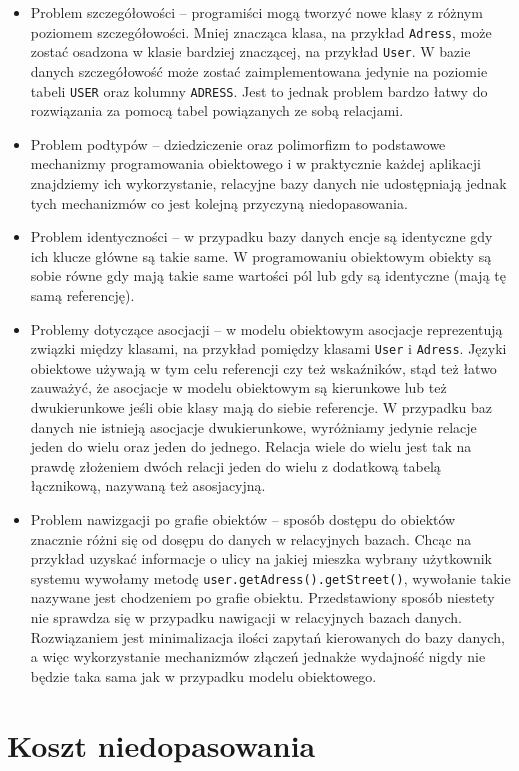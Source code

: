 \documentclass[12pt]{report}
\begin{document}
\begin{itemize}
\item Problem szczegółowości -- programiści mogą tworzyć nowe klasy z różnym poziomem szczegółowości. Mniej znacząca klasa, na przykład {\tt Adress}, może zostać
osadzona w klasie bardziej znaczącej, na przykład {\tt User}. W bazie danych szczegółowość może zostać zaimplementowana jedynie na po\-ziomie tabeli
{\tt USER} oraz kolumny {\tt ADRESS}. Jest to jednak problem bardzo łatwy do rozwiązania za pomocą tabel powiązanych ze sobą relacjami.
\item Problem podtypów -- dziedziczenie oraz polimorfizm to podstawowe mechanizmy programowania obiektowego i w praktycznie każdej aplikacji znajdziemy ich 
wykorzystanie, relacyjne bazy danych nie udostępniają jednak tych mechanizmów co jest kolejną przyczyną niedopasowania.
\item Problem identyczności -- w przypadku bazy danych encje są identyczne gdy ich klucze główne są takie same. W programowaniu obiektowym obiekty są sobie równe
gdy mają takie same wartości pól lub gdy są identyczne (mają tę samą referencję).
\item Problemy dotyczące asocjacji -- w modelu obiektowym asocjacje reprezentują związki między klasami, na przykład pomiędzy klasami {\tt User} i {\tt Adress}. Języki
obiektowe używają w tym celu referencji czy też wskaźników, stąd też łatwo zauważyć, że asocjacje w modelu obiektowym są kierunkowe lub też dwu\-kierunkowe jeśli
obie klasy mają do siebie referencje. W przypadku baz danych nie istnieją asocjacje dwukierunkowe, wyróżniamy jedynie relacje jeden do wielu oraz jeden do jednego.
Relacja wiele do wielu jest tak na prawdę złożeniem dwóch relacji jeden do wielu z dodatkową tabelą łącznikową, na\-zywaną też asosjacyjną.
\item Problem nawizgacji po grafie obiektów -- sposób dostępu do obiektów zna\-cznie różni się od dosępu do danych w relacyjnych bazach. Chcąc na przykład uzyskać
informacje o ulicy na jakiej mieszka wybrany użytkownik systemu wywołamy metodę {\tt user.getAdress().getStreet()}, wywołanie takie nazywane jest chodzeniem
po grafie obiektu. Przedstawiony sposób niestety nie sprawdza się w przypadku nawigacji w relacyjnych bazach danych. Rozwią\-zaniem jest minimalizacja ilości zapytań
kierowanych do bazy danych, a więc wykorzystanie mechanizmów złączeń jednakże wydajność nigdy nie będzie taka sama jak w przypadku modelu obiektowego.
\end{itemize}

\section{Koszt niedopasowania}
\end{document}
